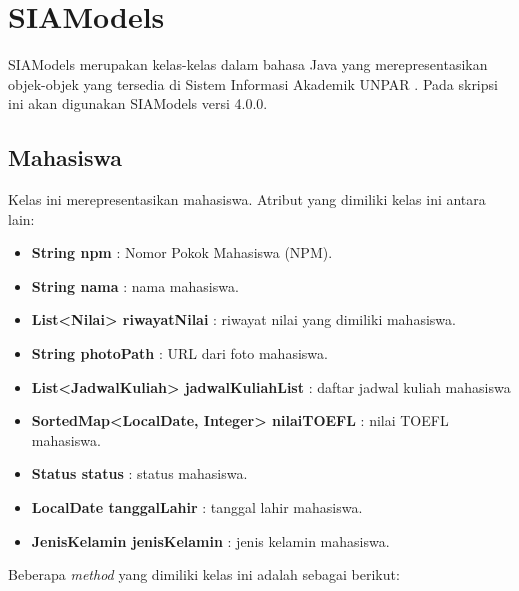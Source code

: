 \section{SIAModels}
\label{sec:siamodels}

SIAModels merupakan kelas-kelas dalam bahasa Java yang merepresentasikan objek-objek yang tersedia di Sistem Informasi Akademik UNPAR \cite{siamodels}. Pada skripsi ini akan digunakan SIAModels versi 4.0.0.

\subsection{Mahasiswa}
Kelas ini merepresentasikan mahasiswa. Atribut yang dimiliki kelas ini antara lain:
\begin{itemize}
	\item \textbf{String npm} : Nomor Pokok Mahasiswa (NPM).
	\item \textbf{String nama} : nama mahasiswa.
	\item \textbf{List<Nilai> riwayatNilai} : riwayat nilai yang dimiliki mahasiswa.
	\item \textbf{String photoPath} : URL dari foto mahasiswa.
	\item \textbf{List<JadwalKuliah> jadwalKuliahList} : daftar jadwal kuliah mahasiswa
	\item \textbf{SortedMap<LocalDate, Integer> nilaiTOEFL} : nilai TOEFL mahasiswa.
	\item \textbf{Status status} : status mahasiswa.
	\item \textbf{LocalDate tanggalLahir} : tanggal lahir mahasiswa.
	\item \textbf{JenisKelamin jenisKelamin} : jenis kelamin mahasiswa.

\end{itemize}
Beberapa \textit{method} yang dimiliki kelas ini adalah sebagai berikut:

